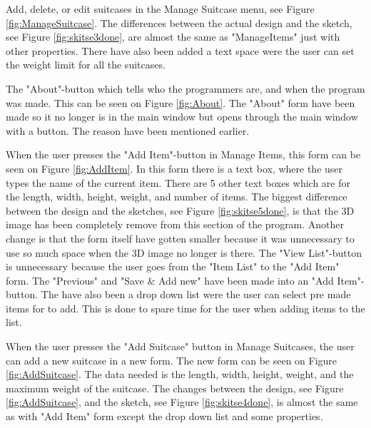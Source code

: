 Add, delete, or edit suitcases in the Manage Suitcase menu, see Figure \ref{fig:ManageSuitcase}. The differences between the actual design and the sketch, see Figure \ref{fig:skitse3done}, are almost the same as "ManageItems" just with other properties. There have also been added a text space were the user can set the weight limit for all the suitcases.

The "About"-button which tells who the programmers are, and when the program was made. This can be seen on Figure \ref{fig:About}. The "About" form have been made so it no longer is in the main window but opens through the main window with a button. The reason have been mentioned earlier.

When the user presses the "Add Item"-button in Manage Items, this form can be seen on Figure \ref{fig:AddItem}. In this form there is a text box, where the user types the name of the current item. There are 5 other text boxes which are for the length, width, height, weight, and number of items. The biggest difference between the design and the sketches, see Figure \ref{fig:skitse5done}, is that the 3D image has been completely remove from this section of the program. Another change is that the form itself have gotten smaller because it was unnecessary to use so much space when the 3D image no longer is there. The "View List"-button is unnecessary because the user goes from the "Item List" to the "Add Item" form. The "Previous" and "Save \& Add new" have been made into an "Add Item"-button. The have also been a drop down list were the user can select pre made items for to add. This is done to spare time for the user when adding items to the list.

When the user presses the "Add Suitcase" button in Manage Suitcases, the user can add a new suitcase in a new form. The new form can be seen on Figure \ref{fig:AddSuitcase}. The data needed is the length, width, height, weight, and the maximum weight of the suitcase. The changes between the design, see Figure \ref{fig:AddSuitcase}, and the sketch, see Figure \ref{fig:skitse4done}, is almost the same as with "Add Item" form except the drop down list and some properties.

